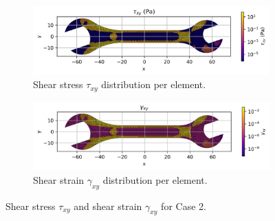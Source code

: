 \begin{figure}[H]
    \centering
    \begin{subfigure}[t]{0.49\textwidth}
      \centering
      \includegraphics[width=\textwidth]{GRAFICOS/Case a - tau_xy_per_element.png}
      \caption{Shear stress $\tau_{xy}$ distribution per element.}
      \label{fig:tau_xy_a}
    \end{subfigure}
    \hfill
    \begin{subfigure}[t]{0.49\textwidth}
      \centering
      \includegraphics[width=\textwidth]{GRAFICOS/Case a - gamma_xy_per_element.png}
      \caption{Shear strain $\gamma_{xy}$ distribution per element.}
      \label{fig:gamma_xy_a}
    \end{subfigure}
    \caption{Shear stress $\tau_{xy}$ and shear strain $\gamma_{xy}$ for Case 2.}
    \label{fig:shear_fields_a}
\end{figure}

